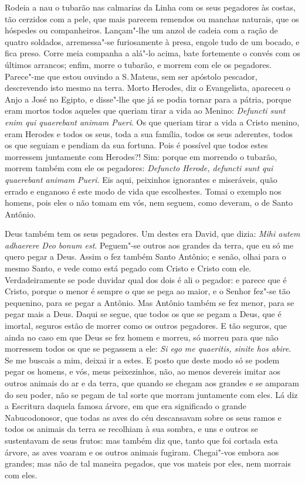 Rodeia a nau o tubarão nas calmarias da Linha com os seus pegadores às
costas, tão cerzidos com a pele, que mais parecem remendos ou manchas
naturais, que os hóspedes ou companheiros. Lançam"-lhe um anzol de cadeia
com a ração de quatro soldados, arremessa"-se furiosamente à presa,
engole tudo de um bocado, e fica preso. Corre meia companha a alá"-lo
acima, bate fortemente o convés com os últimos arrancos; enfim, morre o
tubarão, e morrem com ele os pegadores.
Parece"-me que estou ouvindo a S.\,Mateus, sem ser apóstolo pescador,
descrevendo isto mesmo na terra. Morto Herodes, diz o Evangelista,
apareceu o Anjo a José no Egipto, e disse"-lhe que já se podia tornar
para a pátria, porque eram mortos todos aqueles que queriam tirar a
vida ao Menino: \emph{Defuncti sunt enim qui quaerebant animam Pueri}.
Os que queriam tirar a vida a Cristo menino, eram Herodes e todos os
seus, toda a sua família, todos os seus aderentes, todos os que seguiam
e pendiam da sua fortuna. Pois é possível que todos estes morressem
juntamente com Herodes?! Sim: porque em morrendo o tubarão, morrem
também com ele os pegadores: \emph{Defuncto Herode, defuncti sunt qui
quaerebant animam Pueri}.
Eis aqui, peixinhos ignorantes e miseráveis, quão errado e enganoso é
este modo de vida que escolhestes. Tomai o exemplo nos homens, pois eles
o não tomam em vós, nem seguem, como deveram, o de Santo Antônio.

Deus também tem os seus pegadores. Um destes era David, que dizia:
\emph{Mihi autem adhaerere Deo bonum est}. Peguem"-se outros aos grandes
da terra, que eu só me quero pegar a Deus. Assim o fez também Santo
Antônio; e senão, olhai para o mesmo Santo, e vede como está pegado com
Cristo e Cristo com ele. Verdadeiramente se pode duvidar qual dos dois é
ali o pegador: e parece que é Cristo, porque o menor é sempre o que se
pega ao maior, e o Senhor fez"-se tão pequenino, para se pegar a Antônio.
Mas Antônio também se fez menor, para se pegar mais a Deus. Daqui se
segue, que todos os que se pegam a Deus, que é imortal, seguros estão de
morrer como os outros pegadores. E tão seguros, que ainda no caso em que
Deus se fez homem e morreu, só morreu para que não morressem todos os
que se pegassem a ele: \emph{Si ego me quaeritis, sinite hos abire}.
Se me buscais a mim, deixai ir a estes. E posto que deste modo só se
podem pegar os homens, e vós, meus peixezinhos, não, ao menos devereis
imitar aos outros animais do ar e da terra, que quando se chegam aos
grandes e se amparam do seu poder, não se pegam de tal sorte que morram
juntamente com eles. Lá diz a Escritura daquela famosa árvore, em que
era significado o grande Nabucodonosor, que todas as aves do céu
descansavam sobre os seus ramos e todos os animais da terra se recolhiam
à sua sombra, e uns e outros se sustentavam de seus frutos: mas
também diz que, tanto que foi cortada esta árvore, as aves voaram e os
outros animais fugiram. Chegai"-vos embora aos grandes; mas não de tal
maneira pegados, que vos mateis por eles, nem morrais com eles.


